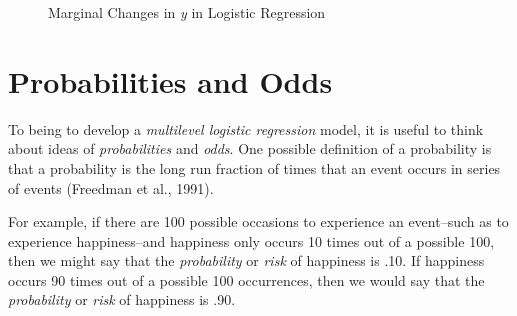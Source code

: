 \documentclass[
  letterpaper,
  DIV=11,
  numbers=noendperiod]{scrreprt}
\begin{document}
\begin{figure}


\caption{\label{fig-marginal-changes}Marginal Changes in \emph{y} in
Logistic Regression}

\end{figure}%

\section{Probabilities and Odds}\label{probabilities-and-odds}

To being to develop a \emph{multilevel logistic regression} model, it is
useful to think about ideas of \emph{probabilities} and \emph{odds}. One
possible definition of a probability is that a probability is the long
run fraction of times that an event occurs in series of events (Freedman
et al., 1991). 

For example, if there are 100 possible occasions to experience an
event--such as to experience happiness--and happiness only occurs 10
times out of a possible 100, then we might say that the
\emph{probability} or \emph{risk} of happiness is .10. If happiness
occurs 90 times out of a possible 100 occurrences, then we would say
that the \emph{probability} or \emph{risk} of happiness is .90.
\end{document}
